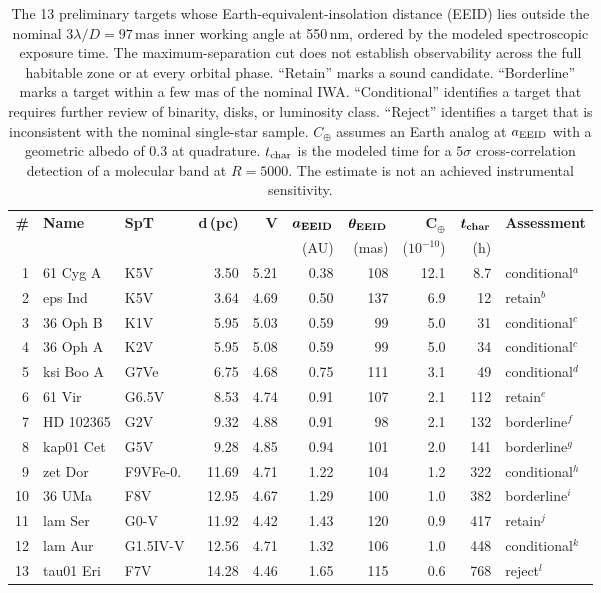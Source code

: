 \begin{table}[tp]
\centering
\small
\setlength{\tabcolsep}{5pt}
\begin{tabular}{r l l r r r r r r l}
\toprule
\textbf{\#} & \textbf{Name} & \textbf{SpT} & \textbf{d\,(pc)} & \textbf{V} & $\boldsymbol{a_{\rm EEID}}$ & $\boldsymbol{\theta_{\rm EEID}}$ & $\boldsymbol{C_{\oplus}}$ & $\boldsymbol{t_{\rm char}}$ & \textbf{Assessment} \\
 & & & & & (AU) & (mas) & ($10^{-10}$) & (h) & \\
\midrule
1 & 61 Cyg A & K5V & 3.50 & 5.21 & 0.38 & 108 & 12.1 & 8.7 & conditional$^{a}$ \\
2 & eps Ind & K5V & 3.64 & 4.69 & 0.50 & 137 & 6.9 & 12 & retain$^{b}$ \\
3 & 36 Oph B & K1V & 5.95 & 5.03 & 0.59 & 99 & 5.0 & 31 & conditional$^{c}$ \\
4 & 36 Oph A & K2V & 5.95 & 5.08 & 0.59 & 99 & 5.0 & 34 & conditional$^{c}$ \\
5 & ksi Boo A & G7Ve & 6.75 & 4.68 & 0.75 & 111 & 3.1 & 49 & conditional$^{d}$ \\
6 & 61 Vir & G6.5V & 8.53 & 4.74 & 0.91 & 107 & 2.1 & 112 & retain$^{e}$ \\
7 & HD 102365 & G2V & 9.32 & 4.88 & 0.91 & 98 & 2.1 & 132 & borderline$^{f}$ \\
8 & kap01 Cet & G5V & 9.28 & 4.85 & 0.94 & 101 & 2.0 & 141 & borderline$^{g}$ \\
9 & zet Dor & F9VFe-0. & 11.69 & 4.71 & 1.22 & 104 & 1.2 & 322 & conditional$^{h}$ \\
10 & 36 UMa & F8V & 12.95 & 4.67 & 1.29 & 100 & 1.0 & 382 & borderline$^{i}$ \\
11 & lam Ser & G0-V & 11.92 & 4.42 & 1.43 & 120 & 0.9 & 417 & retain$^{j}$ \\
12 & lam Aur & G1.5IV-V & 12.56 & 4.71 & 1.32 & 106 & 1.0 & 448 & conditional$^{k}$ \\
13 & tau01 Eri & F7V & 14.28 & 4.46 & 1.65 & 115 & 0.6 & 768 & reject$^{l}$ \\
\bottomrule
\end{tabular}
\caption{The 13 preliminary targets whose Earth-equivalent-insolation distance (EEID) lies outside the nominal $3\lambda/D=97$\,mas inner working angle at 550\,nm, ordered by the modeled spectroscopic exposure time. The maximum-separation cut does not establish observability across the full habitable zone or at every orbital phase. ``Retain'' marks a sound candidate. ``Borderline'' marks a target within a few mas of the nominal IWA. ``Conditional'' identifies a target that requires further review of binarity, disks, or luminosity class. ``Reject'' identifies a target that is inconsistent with the nominal single-star sample. $C_\oplus$ assumes an Earth analog at $a_{\rm EEID}$ with a geometric albedo of 0.3 at quadrature. $t_{\rm char}$ is the modeled time for a $5\sigma$ cross-correlation detection of a molecular band at $R=5000$. The estimate is not an achieved instrumental sensitivity.}

\end{table}

